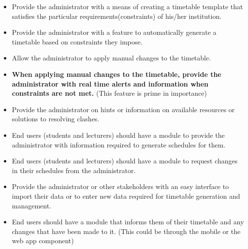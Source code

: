 \documentclass{scrreprt}
\begin{document}
\begin{itemize}
 \item Provide the administrator with a means of creating a timetable template that satisfies the particular requirements(constraints) of his/her institution.
 \item Provide the administrator with a feature to automatically generate a timetable based on constraints they impose.
 \item Allow the administrator to apply manual changes to the timetable.
 \item \textbf{ When applying manual changes to the timetable, provide the administrator with real time alerts and information when constraints are not met.} (This feature is prime in importance)
 \item Provide the administrator on hints or information on available resources or solutions to resolving clashes.
 \item End users (students and lecturers) should have a module to provide the administrator with information required to generate schedules for them.
 \item End users (students and lecturers) should have a module to request changes in their schedules from the administrator.
 \item Provide the administrator or other stakeholders with an easy interface to import their data or to enter new data required for timetable generation and management.
 \item End users should have a module that informs them of their timetable and any changes that have been made to it. (This could be through the mobile or the web app component)
\end{itemize}

\end{document}
